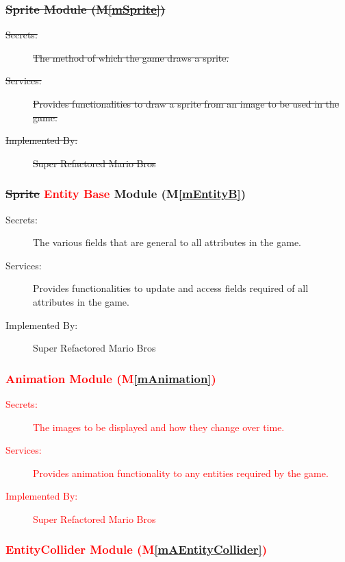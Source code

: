 \documentclass[12pt, titlepage]{article}
\newcommand{\mref}[1]{M\ref{#1}}
\begin{document}
\subsubsection{\sout{Sprite Module (\mref{mSprite})}}

\begin{description}
\item[\sout{Secrets:}] \sout{The method of which the game draws a sprite.}
\item[\sout{Services:}] \sout{Provides functionalities to draw a sprite from an image to be used in the game.}
\item[\sout{Implemented By:}] \sout{Super Refactored Mario Bros}
\end{description}

\subsubsection{\sout{Sprite} \textcolor{red}{Entity Base} Module (\mref{mEntityB})}

\begin{description}
\item[Secrets:] The various fields that are general to all attributes in the game.
\item[Services:] Provides functionalities to update and access fields required of all attributes in the game.
\item[Implemented By:] Super Refactored Mario Bros
\end{description}

\subsubsection{\textcolor{red}{Animation Module (\mref{mAnimation})}}

\begin{description}
\item[\textcolor{red}{Secrets:}] \textcolor{red}{The images to be displayed and how they change over time.}
\item[\textcolor{red}{Services:}] \textcolor{red}{Provides animation functionality to any entities required by the game.}
\item[\textcolor{red}{Implemented By:}] \textcolor{red}{Super Refactored Mario Bros}
\end{description}

\subsubsection{\textcolor{red}{EntityCollider Module (\mref{mAEntityCollider})}}
\end{document}
